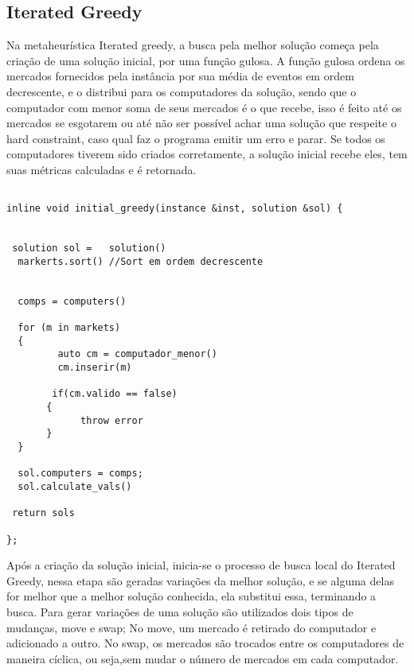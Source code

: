\documentclass[12pt]{article}
\begin{document}
\subsection{Iterated Greedy}


Na metaheurística Iterated greedy, a busca pela melhor solução começa pela criação de uma solução inicial, por uma função gulosa. A função gulosa ordena os mercados fornecidos pela instância por sua média de eventos em ordem decrescente, e o distribui para os computadores da solução, sendo que o computador com menor soma de seus mercados é o que recebe, isso é feito até os mercados se esgotarem ou até não ser possível achar uma solução que respeite o hard constraint, caso qual faz o programa emitir um erro e parar. Se todos os computadores tiverem sido criados corretamente, a solução inicial recebe eles, tem suas métricas calculadas e é retornada.





\begin{lstlisting}

inline void initial_greedy(instance &inst, solution &sol) {
 

 solution sol =   solution()
  markerts.sort() //Sort em ordem decrescente


  comps = computers()

  for (m in markets)
  {
         auto cm = computador_menor()
         cm.inserir(m)
         
        if(cm.valido == false)
       {
             throw error
       }
  }

  sol.computers = comps;
  sol.calculate_vals()

 return sols

};

\end{lstlisting}
\begingroup
{}
\endgroup


Após a criação da solução inicial, inicia-se o processo de busca local do Iterated Greedy, nessa etapa são geradas variações da melhor solução, e se alguma delas for melhor que a melhor solução conhecida, ela substitui essa, terminando a busca. Para gerar variações de uma solução são utilizados dois tipos de mudanças, move e swap; No move, um mercado é retirado do computador e adicionado a outro. No swap, os mercados são trocados entre os computadores de maneira cíclica, ou seja,sem mudar o número de mercados em cada computador. 
\end{document}
